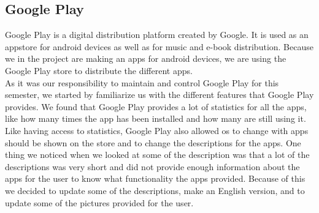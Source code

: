 \subsection{Google Play}
Google Play is a digital distribution platform created by Google. It is used as an appstore for android devices as well as for music and e-book distribution. Because we in the project are making an apps for android devices, we are using the Google Play store to distribute the different apps. \\

As it was our responsibility to maintain and control Google Play for this semester, we started by familiarize us with the different features that Google Play provides. We found that Google Play provides a lot of statistics for all the apps, like how many times the app has been installed and how many are still using it. Like having access to statistics, Google Play also allowed os to change with apps should be shown on the store and to change the descriptions for the apps. One thing we noticed when we looked at some of the description was that a lot of the descriptions was very short and did not provide enough information about the apps for the user to know what functionality the apps provided. Because of this we decided to update some of the descriptions, make an English version, and to update some of the pictures provided for the user.

